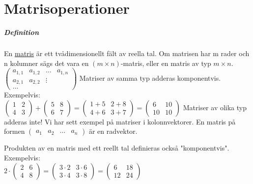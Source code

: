 \chapter{Matrisoperationer}
\paragraph{Definition} En \underline{matris} är ett tvådimensionellt fält av reella tal.
Om matrisen har m rader och n kolumner sägs det vara en $(m\times n)$-matris, eller en matris av typ $m\times n$.
$\begin{pmatrix}
    a_{1,1} & a_{1,2} & \ldots & a_{1,n}\\
    a_{2,1} & a_{2,2} & \vdots & \\
    \ldots
\end{pmatrix}$
Matriser av samma typ adderas komponentvis. Exempelvis:\\
$\begin{pmatrix}
    1&2\\4&3
\end{pmatrix}+\begin{pmatrix}
    5&8\\6&7
\end{pmatrix}=
\begin{pmatrix}
    1+5&2+8\\4+6&3+7
\end{pmatrix}=\begin{pmatrix}
    6&10\\10&10
\end{pmatrix}$
Matriser av olika typ adderas inte!
Vi har sett exempel på matriser i kolonnvektorer.
En matris på formen $\begin{pmatrix}a_{1}&a_{2}&\hdots&a_{n}\end{pmatrix}$ är en radvektor.

Produkten av en matris med ett reellt tal definieras också "komponentvis". Exempelvis:\\
$2\cdot \begin{pmatrix}
    2&6\\4&8
\end{pmatrix}=\begin{pmatrix}
    3\cdot 2&3\cdot 6\\3\cdot 4&3\cdot 8
\end{pmatrix}=\begin{pmatrix}
    6&18\\12&24
\end{pmatrix}$

